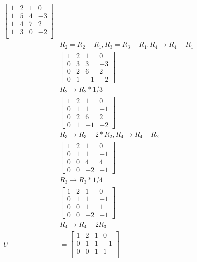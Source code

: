 \documentclass{report}
\begin{document}
{\begin{align*}
\begin{bmatrix}
            1& 2& 1& 0\\
            1& 5& 4& -3\\
            1& 4& 7& 2\\
            1& 3& 0& -2\\
        \end{bmatrix}\\
        & R_2=R_2-R_1,R_3=R_3-R_1,R_4\rightarrow R_4-R_1\\
        & \begin{bmatrix}
            1& 2& 1& 0\\
            0&3&3&-3\\
            0&2&6&2\\
            0&1&-1&-2
        \end{bmatrix}\\
        & R_2\rightarrow R_2*1/3\\
        & \begin{bmatrix}
            1& 2& 1& 0\\
            0& 1& 1& -1\\
            0&2&6&2\\
            0&1&-1&-2
        \end{bmatrix}\\
        & R_3 \rightarrow R_3 -2*R_2,R_4\rightarrow R_4-R_2\\
        & \begin{bmatrix}            
            1& 2& 1& 0\\
            0& 1& 1& -1\\
            0&0&4&4\\
            0&0&-2&-1
        \end{bmatrix}\\
        &R_3\rightarrow R_3*1/4\\
        & \begin{bmatrix}            
            1& 2& 1& 0\\
            0& 1& 1& -1\\
            0&0&1&1\\
            0&0&-2&-1
        \end{bmatrix}\\
        & R_4 \rightarrow R_4+2R_3\\
        U & = \begin{bmatrix}            
            1& 2& 1& 0\\
            0& 1& 1& -1\\
            0&0&1&1\\

\end{bmatrix}
\end{align*}}
\end{document}
